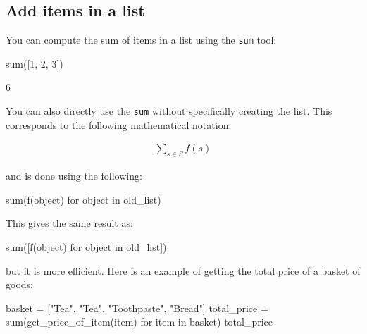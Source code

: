 \begin{raw}
[0.5, 0.5, 3.5, 2]
\end{raw}





\subsection{Add items in a list}
\label{\detokenize{tools-for-mathematics/06-probability/how/main:adding-items-in-a-list}}

You can compute the sum of items in a list using the \texttt{sum} tool:




\begin{pyin}
sum([1, 2, 3])
\end{pyin}





\begin{raw}
6
\end{raw}





You can also directly use the \texttt{sum} without specifically creating the list. This
corresponds to the following mathematical notation:

\begin{equation*}
\begin{split}
    \sum_{s\in S}f(s)
\end{split}
\end{equation*}

and is done using the following:

\begin{pyin}
sum(f(object) for object in old_list)
\end{pyin}


This gives the same result as:

\begin{pyin}
sum([f(object) for object in old_list])
\end{pyin}


but it is more efficient.
Here is an example of getting the total price of a basket of goods:




\begin{pyin}
basket = ["Tea", "Tea", "Toothpaste", "Bread"]
total_price = sum(get_price_of_item(item) for item in basket)
total_price
\end{pyin}





